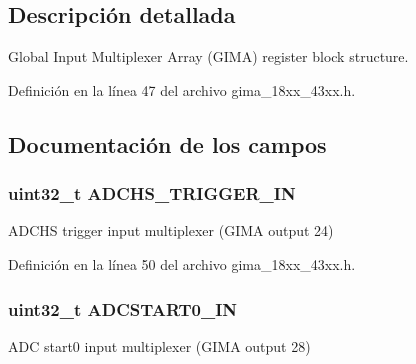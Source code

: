\subsection{Descripción detallada}
Global Input Multiplexer Array (G\+I\+MA) register block structure. 

Definición en la línea 47 del archivo gima\+\_\+18xx\+\_\+43xx.\+h.



\subsection{Documentación de los campos}
\subsubsection[{\texorpdfstring{A\+D\+C\+H\+S\+\_\+\+T\+R\+I\+G\+G\+E\+R\+\_\+\+IN}{ADCHS_TRIGGER_IN}}]{ uint32\+\_\+t A\+D\+C\+H\+S\+\_\+\+T\+R\+I\+G\+G\+E\+R\+\_\+\+IN}\hypertarget{struct_l_p_c___g_i_m_a___t_a402df8694f8b3f4840c01a87aa8530b8}{}\label{struct_l_p_c___g_i_m_a___t_a402df8694f8b3f4840c01a87aa8530b8}
A\+D\+C\+HS trigger input multiplexer (G\+I\+MA output 24) 

Definición en la línea 50 del archivo gima\+\_\+18xx\+\_\+43xx.\+h.

\subsubsection[{\texorpdfstring{A\+D\+C\+S\+T\+A\+R\+T0\+\_\+\+IN}{ADCSTART0_IN}}]{ uint32\+\_\+t A\+D\+C\+S\+T\+A\+R\+T0\+\_\+\+IN}\hypertarget{struct_l_p_c___g_i_m_a___t_a370eea1cefafc9d083c4794bc893d906}{}\label{struct_l_p_c___g_i_m_a___t_a370eea1cefafc9d083c4794bc893d906}
A\+DC start0 input multiplexer (G\+I\+MA output 28) 


